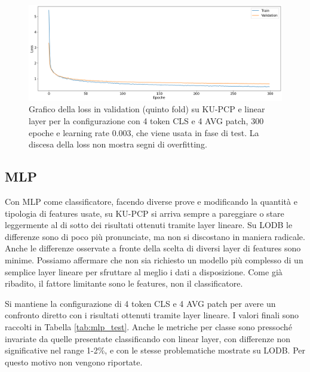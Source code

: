 \begin{figure}[p]
    \centering
    \includegraphics[width=\linewidth]{Immagini/risultati/loss-kupcp-linear.png}
    \caption{Grafico della loss in validation (quinto fold) su KU-PCP e linear layer per la configurazione con 4 token CLS e 4 AVG patch, 300 epoche e learning rate 0.003, che viene usata in fase di test. La discesa della loss non mostra segni di overfitting.}
    \label{fig:loss-kupcp-linear}
\end{figure}

\subsection{MLP}
Con MLP come classificatore, facendo diverse prove e modificando la quantità e tipologia di features usate, su KU-PCP si arriva sempre a pareggiare o stare leggermente al di sotto dei risultati ottenuti tramite layer lineare. Su LODB le differenze sono di poco più pronunciate, ma non si discostano in maniera radicale. Anche le differenze osservate a fronte della scelta di diversi layer di features sono minime. Possiamo affermare che non sia richiesto un modello più complesso di un semplice layer lineare per sfruttare al meglio i dati a disposizione. Come già ribadito, il fattore limitante sono le features, non il classificatore.

Si mantiene la configurazione di 4 token CLS e 4 AVG patch per avere un confronto diretto con i risultati ottenuti tramite layer lineare. I valori finali sono raccolti in Tabella \ref{tab:mlp_test}. Anche le metriche per classe sono pressoché invariate da quelle presentate classificando con linear layer, con differenze non significative nel range 1-2\%, e con le stesse problematiche mostrate su LODB. Per questo motivo non vengono riportate.

